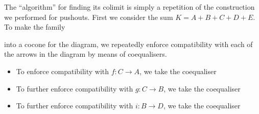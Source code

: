 The ``algorithm'' for finding its colimit is simply a repetition of the
construction we performed for pushouts.  First we consider the sum
$K=A+B+C+D+E$.  To make the family 
\begin{center}\end{center}
into a cocone for the diagram, we repeatedly enforce compatibility with each
of the arrows in the diagram by means of coequalisers.
\begin{itemize}
\item
  To enforce compatibility with $f: C\to A$, we take the coequaliser
  \begin{center}\end{center}

\item
  To further enforce compatibility with $g:C\to B$, we take the coequaliser
  \begin{center}\end{center}

\item
  To further enforce compatibility with $i:B\to D$, we take the coequaliser
  \begin{center}\end{center}


\end{itemize}
